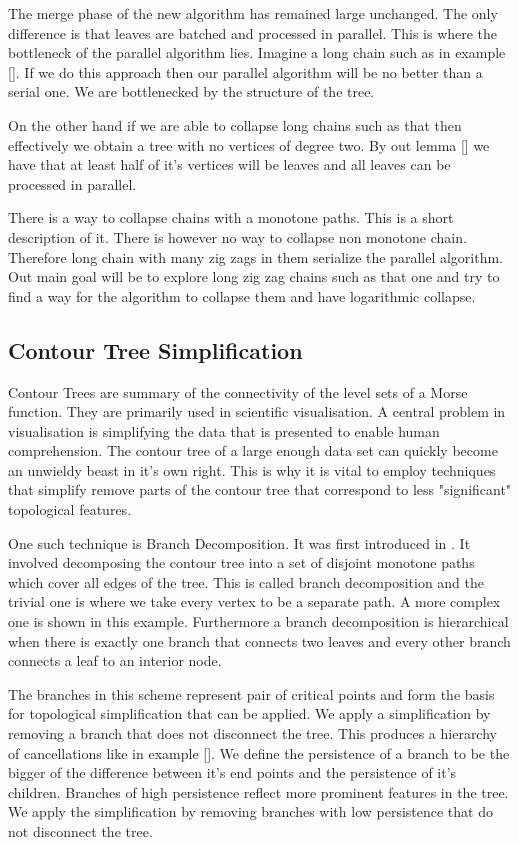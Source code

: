The merge phase of the new algorithm has remained large unchanged. The only difference is that leaves are batched and processed in parallel. This is where the bottleneck of the parallel algorithm lies. Imagine a long chain such as in example []. If we do this approach then our parallel algorithm will be no better than a serial one. We are bottlenecked by the structure of the tree. 

On the other hand if we are able to collapse long chains such as that then effectively we obtain a tree with no vertices of degree two. By out lemma [] we have that at least half of it's vertices will be leaves and all leaves can be processed in parallel.

There is a way to collapse chains with a monotone paths. This is a short description of it. There is however no way to collapse non monotone chain. Therefore long chain with many zig zags in them serialize the parallel algorithm. Out main goal will be to explore long zig zag chains such as that one and try to find a way for the algorithm to collapse them and have logarithmic collapse.

\subsection{Contour Tree Simplification}

Contour Trees are summary of the connectivity of the level sets of a Morse function. They are primarily used in scientific visualisation. A central problem in visualisation is simplifying the data that is presented to enable human comprehension. The contour tree of a large enough data set can quickly become an unwieldy beast in it's own right. This is why it is vital to employ techniques that simplify remove parts of the contour tree that correspond to less "significant" topological features.

One such technique is Branch Decomposition. It was first introduced in \cite{ct-branch-decomp}. It involved decomposing the contour tree into a set of disjoint monotone paths which cover all edges of the tree. This is called branch decomposition and the trivial one is where we take every vertex to be a separate path. A more complex one is shown in this example. Furthermore a branch decomposition is hierarchical when there is exactly one branch that connects two leaves and every other branch connects a leaf to an interior node.

The branches in this scheme represent pair of critical points and form the basis for topological simplification that can be applied. We apply a simplification by removing a branch that does not disconnect the tree. This produces a hierarchy of cancellations like in example []. We define the persistence of a branch to be the bigger of the difference between it's end points and the persistence of it's children. Branches of high persistence reflect more prominent features in the tree. We apply the simplification by removing branches with low persistence that do not disconnect the tree.

